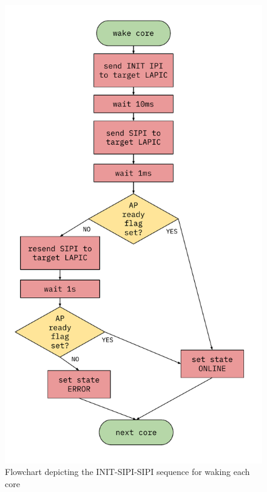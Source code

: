 \documentclass[bsc,frontabs,singlespacing,parskip,deptreport]{infthesis}
\begin{document}
\begin{figure}[h!]
    \centering
    \includegraphics[scale=0.6]{figures/init-sipi-sipi.pdf}
    \caption{Flowchart depicting the INIT-SIPI-SIPI sequence for waking each core}
    \label{init-sipi-sipi}
\end{figure}
\end{document}
